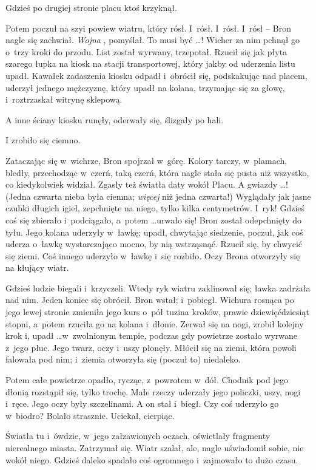 \documentclass[oneside,polish,11pt,rmheadings]{mwbk}
\begin{document}
Gdzieś po drugiej stronie placu ktoś krzyknął. 

Potem poczuł na szyi powiew wiatru, który rósł. I~rósł. I~rósł. I~rósł -- Bron nagle się  zachwiał. \textit{Wojna }, pomyślał. To musi być  \ldots  ! Wicher za nim pchnął go o~trzy kroki do przodu. List został wyrwany, trzepotał. Rzucił się jak płyta szarego łupka na kiosk na stacji transportowej, który jakby od uderzenia listu upadł. Kawałek zadaszenia kiosku odpadł i~obrócił się, podskakując nad placem, uderzył jednego mężczyznę, który upadł na kolana, trzymając się za głowę, i~roztrzaskał witrynę sklepową. 

A inne ściany kiosku runęły, oderwały się, ślizgały po hali. 

I zrobiło się ciemno. 

Zataczając się w~wichrze, Bron spojrzał w~górę. Kolory tarczy, w~plamach, bledły, przechodząc w~czerń, taką czerń, która nagle stała się  pusta niż wszystko, co kiedykolwiek widział. Zgasły też światła daty wokół Placu. A gwiazdy \ldots ! (Jedna czwarta nieba była ciemna;  \textit{więcej }niż jedna czwarta!) Wyglądały jak jasne czubki długich igieł, zepchnięte na niego, tylko kilka centymetrów. I~ryk! Gdzieś coś się zbierało i~podciągało, a~potem \ldots  urwało się! Bron został odepchnięty do tyłu. Jego kolana uderzyły w~ławkę; upadł, chwytając siedzenie, poczuł, jak coś uderza o~ławkę wystarczająco mocno, by nią wstrząsnąć. Rzucił się, by chwycić się ziemi. Coś innego uderzyło w~ławkę i~się rozbiło. Oczy Brona otworzyły się na kłujący wiatr. 

Gdzieś ludzie biegali i~krzyczeli. Wtedy ryk wiatru zaklinował się; ławka zadrżała nad nim. Jeden koniec się obrócił. Bron wstał; i~pobiegł. Wichura rosnąca po jego lewej stronie zmieniła jego kurs o~pół tuzina kroków, prawie dziewięćdziesiąt stopni, a~potem rzuciła go na kolana i~dłonie. Zerwał się na nogi, zrobił kolejny krok i, upadł \ldots  w~zwolnionym tempie, podczas gdy powietrze zostało wyrwane z~jego płuc. Jego twarz, oczy i~uszy płonęły. Młócił się na ziemi, która powoli falowała pod nim; i~ziemia otworzyła się (poczuł to) niedaleko. 

Potem całe powietrze opadło, rycząc, z~powrotem w~dół. Chodnik pod jego dłonią rozstąpił się, tylko trochę. Małe rzeczy uderzały jego policzki, uszy, nogi i~ręce. Jego oczy były szczelinami. A on stał i~biegł. Czy coś uderzyło go w~biodro? Bolało strasznie. Uciekał, cierpiąc. 

Światła tu i~ówdzie, w~jego załzawionych oczach, oświetlały fragmenty nierealnego miasta. Zatrzymał się. Wiatr szalał, ale, nagle uświadomił sobie, nie wokół niego. Gdzieś daleko spadało coś ogromnego i~zajmowało to dużo czasu. 
\end{document}
